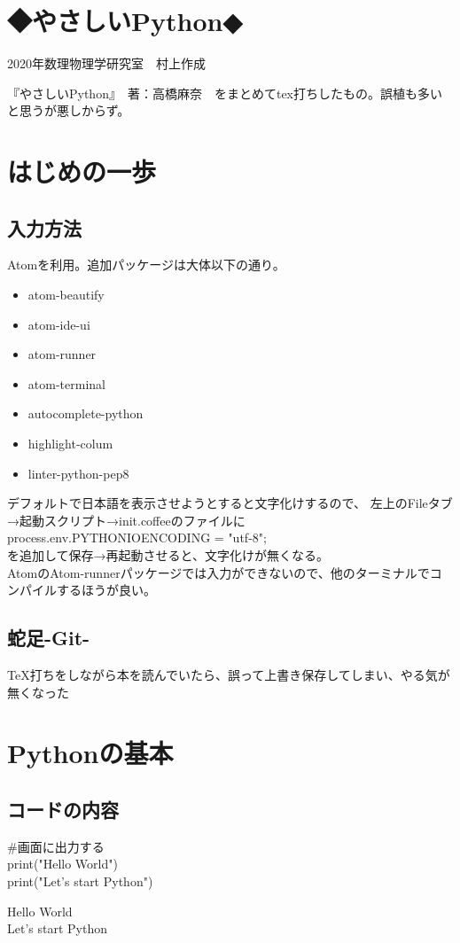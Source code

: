 \documentclass[11pt,a4paper]{jreport}
\begin{document}
%
%
\chapter*{◆やさしいPython◆}
\begin{flushright}
  2020年数理物理学研究室　村上作成
\end{flushright}
『やさしいPython』　著：高橋麻奈　をまとめてtex打ちしたもの。誤植も多いと思うが悪しからず。



\tableofcontents

\chapter{はじめの一歩}%
\section{入力方法}
Atomを利用。追加パッケージは大体以下の通り。
\begin{itemize}
 \item atom-beautify
 \item atom-ide-ui
 \item atom-runner
 \item atom-terminal
 \item autocomplete-python
 \item highlight-colum
 \item linter-python-pep8
\end{itemize}
デフォルトで日本語を表示させようとすると文字化けするので、
左上のFileタブ→起動スクリプト→init.coffeeのファイルに\\
process.env.PYTHONIOENCODING = "utf-8";\\
を追加して保存→再起動させると、文字化けが無くなる。\\

AtomのAtom-runnerパッケージでは入力ができないので、他のターミナルでコンパイルするほうが良い。

\section{蛇足-Git-}
\TeX 打ちをしながら本を読んでいたら、誤って上書き保存してしまい、やる気が無くなった

\chapter{Pythonの基本}%
\section{コードの内容}
\begin{shadebox}
 \#画面に出力する\\
 print("Hello World")\\
 print("Let's start Python")
\end{shadebox}
\vspace{0.2in}
\begin{screen}
 Hello World\\
 Let's start Python
\end{screen}
\vspace{0.2in}
\end{document}
